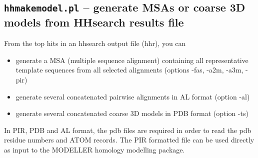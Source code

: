 \documentclass[11pt,a4paper]{article}
\begin{document}
\subsection{{\tt hhmakemodel.pl} -- generate MSAs or coarse 3D models from HHsearch results file}

From the top hits in an hhsearch output file (hhr), you can  
\begin{itemize}
\item{generate a MSA (multiple sequence alignment) containing all representative 
template sequences from all selected alignments (options -fas, -a2m, -a3m, -pir)}
\item{generate several concatenated pairwise alignments in AL format (option -al)}
\item{generate several concatenated coarse 3D models in PDB format (option -ts)}
\end{itemize}
In PIR, PDB and AL format, the pdb files are required in order to read the pdb residue numbers 
and ATOM records. The PIR formatted file can be used directly as input to the MODELLER 
homology modelling package.
\end{document}
